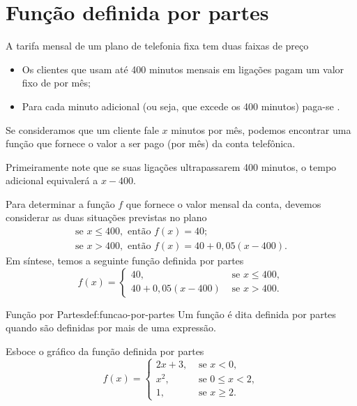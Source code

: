 \section{Função definida por partes}

A tarifa mensal de um plano de telefonia fixa tem duas faixas de preço
\begin{itemize}
  \item Os clientes que usam até 400 minutos mensais em ligações
    pagam um valor fixo de  por mês;

  \item Para cada minuto adicional (ou seja, que excede os 400 minutos)
    paga-se .
\end{itemize}

Se consideramos que um cliente fale $x$ minutos por mês,
podemos encontrar uma função que fornece o valor a ser pago
(por mês) da conta telefônica.

Primeiramente note que se suas ligações ultrapassarem 400 minutos, o tempo
adicional equivalerá a $x-400$.

Para determinar a função $f$ que fornece o valor mensal da conta, devemos
considerar as duas situações previstas no plano
\begin{gather*}
  \text{se } x \leq 400, \text{ então } f(x) = 40; \\
  \text{se } x    > 400, \text{ então } f(x) = 40+0,05(x-400).
\end{gather*}
Em síntese, temos a seguinte função definida por partes
\[
  f(x) = \begin{cases}
  40,            & \text{ se } x \leq 400, \\
  40+0,05(x-400) & \text{ se } x    > 400.
  \end{cases}
\]

\begin{definicao}{Função por Partes}{def:funcao-por-partes}
  Um função é dita definida por partes
  quando são definidas por mais de uma expressão.
\end{definicao}

\begin{example}
  Esboce o gráfico da função definida por partes
  \[
    f(x)=\begin{cases}
      2x+3, & \text{ se } x < 0,        \\
      x^2,  & \text{ se } 0 \leq x < 2, \\
      1,    & \text{ se } x \geq 2.
    \end{cases}
  \]

  \solution
\end{example}

